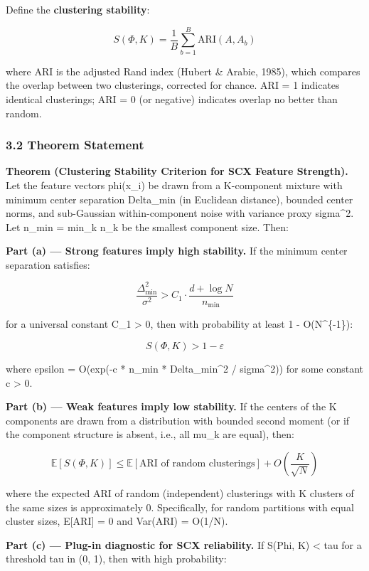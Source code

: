 \documentclass[
  12pt,
]{article}
\begin{document}
Define the \textbf{clustering stability}:

\[S(\Phi, K) = \frac{1}{B} \sum_{b=1}^B \text{ARI}(A, A_b)\]

where ARI is the adjusted Rand index (Hubert \& Arabie, 1985), which
compares the overlap between two clusterings, corrected for chance. ARI
= 1 indicates identical clusterings; ARI = 0 (or negative) indicates
overlap no better than random.

\subsubsection{3.2 Theorem Statement}\label{theorem-statement}

\textbf{Theorem (Clustering Stability Criterion for SCX Feature
Strength).} Let the feature vectors phi(x\_i) be drawn from a
K-component mixture with minimum center separation Delta\_min (in
Euclidean distance), bounded center norms, and sub-Gaussian
within-component noise with variance proxy sigma\^{}2. Let n\_min =
min\_k n\_k be the smallest component size. Then:

\textbf{Part (a) --- Strong features imply high stability.} If the
minimum center separation satisfies:

\[\frac{\Delta_{\min}^2}{\sigma^2} > C_1 \cdot \frac{d + \log N}{n_{\min}}\]

for a universal constant C\_1 \textgreater{} 0, then with probability at
least 1 - O(N\^{}\{-1\}):

\[S(\Phi, K) > 1 - \varepsilon\]

where epsilon = O(exp(-c * n\_min * Delta\_min\^{}2 / sigma\^{}2)) for
some constant c \textgreater{} 0.

\textbf{Part (b) --- Weak features imply low stability.} If the centers
of the K components are drawn from a distribution with bounded second
moment (or if the component structure is absent, i.e., all mu\_k are
equal), then:

\[\mathbb{E}[S(\Phi, K)] \leq \mathbb{E}[\text{ARI of random clusterings}] + O\left(\frac{K}{\sqrt{N}}\right)\]

where the expected ARI of random (independent) clusterings with K
clusters of the same sizes is approximately 0. Specifically, for random
partitions with equal cluster sizes, E{[}ARI{]} = 0 and Var(ARI) =
O(1/N).

\textbf{Part (c) --- Plug-in diagnostic for SCX reliability.} If S(Phi,
K) \textless{} tau for a threshold tau in (0, 1), then with high
probability:
\end{document}
